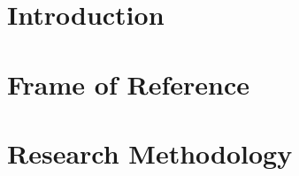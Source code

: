 \documentclass[english,dissertation,final,cover]{his-thesis}
\begin{document}
\begin{frontmatter}
    \thesisabstract{ %
    \lipsum[1]}

    \thesissammanfattning{\lipsum[2}
    
    \thesisacknowledgements{\lipsum[3]}
    
    \begin{ownpublications}
    \end{ownpublications}
\end{frontmatter}

\part*{Introduction} %


\part*{Frame of Reference}


\part*{Research Methodology}

\end{document}
